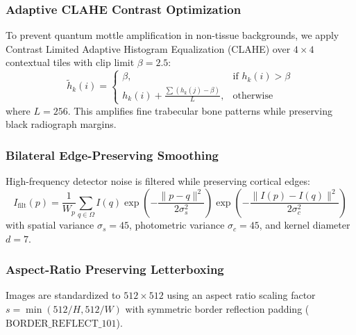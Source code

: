 \documentclass[3p,twocolumn]{elsarticle}
\begin{document}
\subsubsection{Adaptive CLAHE Contrast Optimization}
To prevent quantum mottle amplification in non-tissue backgrounds, we apply Contrast Limited Adaptive Histogram Equalization (CLAHE) over $4 \times 4$ contextual tiles with clip limit $\beta = 2.5$:
\begin{equation}
    \tilde{h}_k(i) = \begin{cases} 
      \beta, & \text{if } h_k(i) > \beta \\
      h_k(i) + \frac{\sum (h_k(j) - \beta)}{L}, & \text{otherwise}
   \end{cases}
\end{equation}
where $L=256$. This amplifies fine trabecular bone patterns while preserving black radiograph margins.

\subsubsection{Bilateral Edge-Preserving Smoothing}
High-frequency detector noise is filtered while preserving cortical edges:
\begin{equation}
    I_{\text{filt}}(p) = \frac{1}{W_p} \sum_{q \in \Omega} I(q) \exp\left(-\frac{\|p - q\|^2}{2\sigma_s^2}\right) \exp\left(-\frac{\|I(p) - I(q)\|^2}{2\sigma_c^2}\right)
\end{equation}
with spatial variance $\sigma_s = 45$, photometric variance $\sigma_c = 45$, and kernel diameter $d = 7$.

\subsubsection{Aspect-Ratio Preserving Letterboxing}
Images are standardized to $512 \times 512$ using an aspect ratio scaling factor $s = \min(512/H, 512/W)$ with symmetric border reflection padding ($\text{BORDER\_REFLECT\_101}$).
\end{document}
